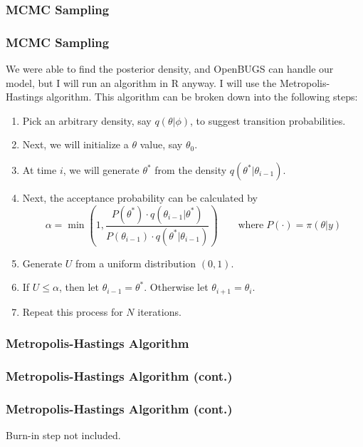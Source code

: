 \documentclass[10pt]{beamer}
\begin{document}
\subsubsection{MCMC Sampling}
\begin{frame}
\frametitle{MCMC Sampling}
	We were able to find the posterior density, and OpenBUGS can handle our model, but I will run an algorithm in R anyway. I will use the Metropolis-Hastings algorithm. This algorithm can be broken down into the following steps:
		\begin{enumerate}
			\item Pick an arbitrary density, say $q(\theta|\phi)$, to suggest transition probabilities.
			\item Next, we will initialize a $\theta$ value, say $\theta_0$.
			\item At time $i$, we will generate $\theta^{*}$ from the density $q\left(\theta^{*}|\theta_{i-1}\right)$.
			\item Next, the acceptance probability can be calculated by $$\alpha=\min\left(1,\frac{P\left(\theta^{*}\right)\cdot q\left(\theta_{i-1}|\theta^{*}\right)}{P\left(\theta_{i-1}\right)\cdot q\left(\theta^{*}|\theta_{i-1}\right)}\right)\qquad\text{where}\;P(\cdot)=\pi(\theta|y)$$
			\item Generate $U$ from a uniform distribution $(0,1)$.
			\item If $U\leq\alpha$, then let $\theta_{i-1}=\theta^{*}$. Otherwise let $\theta_{i+1}=\theta_i$.
			\item Repeat this process for $N$ iterations.
		\end{enumerate}
\end{frame}

\begin{frame}
\frametitle{Metropolis-Hastings Algorithm}
	
\end{frame}

\begin{frame}
\frametitle{Metropolis-Hastings Algorithm (cont.)}
	
\end{frame}

\begin{frame}
\frametitle{Metropolis-Hastings Algorithm (cont.)}
	Burn-in step not included.
	
\end{frame}
\end{document}
